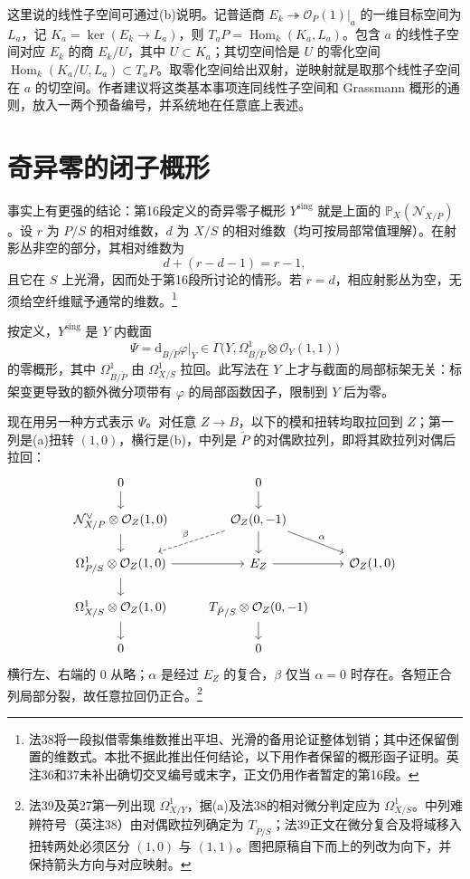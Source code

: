 \documentclass[openany,fontset=fandol]{ctexbook}
\newcommand{\PP}{\mathbb P}
\newcommand{\Ocal}{\mathcal O}
\newcommand{\N}{\mathcal N}
\newcommand{\Pdual}{\check P}
\newcommand{\Ysing}{Y^{\mathrm{sing}}}
\begin{document}
这里说的线性子空间可通过(b)说明。记普适商 $E_k\twoheadrightarrow\Ocal_P(1)|_a$ 的一维目标空间为 $L_a$，记 $K_a=\ker(E_k\to L_a)$，则 $T_aP=\operatorname{Hom}_k(K_a,L_a)$。包含 $a$ 的线性子空间对应 $E_k$ 的商 $E_k/U$，其中 $U\subset K_a$；其切空间恰是 $U$ 的零化空间 $\operatorname{Hom}_k(K_a/U,L_a)\subset T_aP$。取零化空间给出双射，逆映射就是取那个线性子空间在 $a$ 的切空间。作者建议将这类基本事项连同线性子空间和 Grassmann 概形的通则，放入一两个预备编号，并系统地在任意底上表述。

\newpage
\section*{奇异零的闭子概形}
事实上有更强的结论：第16段定义的奇异零子概形 $\Ysing$ 就是上面的 $\PP_X(\N_{X/P})$。设 $r$ 为 $P/S$ 的相对维数，$d$ 为 $X/S$ 的相对维数（均可按局部常值理解）。在射影丛非空的部分，其相对维数为
\[
 d+(r-d-1)=r-1,
\]
且它在 $S$ 上光滑，因而处于第16段所讨论的情形。若 $r=d$，相应射影丛为空，无须给空纤维赋予通常的维数。\footnote{法38将一段拟借零集维数推出平坦、光滑的备用论证整体划销；其中还保留倒置的维数式。本批不据此推出任何结论，以下用作者保留的概形函子证明。英注36和37未补出确切交叉编号或末字，正文仍用作者暂定的第16段。}

按定义，$\Ysing$ 是 $Y$ 内截面
\[
 \Psi=\mathrm d_{B/\Pdual}\varphi\big|_Y
 \in\Gamma\bigl(Y,\Omega^1_{B/\Pdual}\otimes\Ocal_Y(1,1)\bigr)
\]
的零概形，其中 $\Omega^1_{B/\Pdual}$ 由 $\Omega^1_{X/S}$ 拉回。此写法在 $Y$ 上才与截面的局部标架无关：标架变更导致的额外微分项带有 $\varphi$ 的局部函数因子，限制到 $Y$ 后为零。

现在用另一种方式表示 $\Psi$。对任意 $Z\to B$，以下的模和扭转均取拉回到 $Z$；第一列是(a)扭转 $(1,0)$，横行是(b)，中列是 $\Pdual$ 的对偶欧拉列，即将其欧拉列对偶后拉回：
\[
\begin{tikzcd}[row sep=3.3ex,column sep=2.4em]
0\arrow[d] &0\arrow[d] \\
\N^\vee_{X/P}\otimes\Ocal_Z(1,0)\arrow[d] &
 \Ocal_Z(0,-1)\arrow[d]\arrow[dl,dashed,swap,"\beta"]\arrow[dr,"\alpha"] \\
\Omega^1_{P/S}\otimes\Ocal_Z(1,0)\arrow[r]\arrow[d] &
 E_Z\arrow[r] &\Ocal_Z(1,0)\\
\Omega^1_{X/S}\otimes\Ocal_Z(1,0)\arrow[d] &
 T_{\Pdual/S}\otimes\Ocal_Z(0,-1)\arrow[d]\\
0&0
\end{tikzcd}
\]
\noindent 横行左、右端的 $0$ 从略；$\alpha$ 是经过 $E_Z$ 的复合，$\beta$ 仅当 $\alpha=0$ 时存在。各短正合列局部分裂，故任意拉回仍正合。\footnote{法39及英27第一列出现 $\Omega^1_{X/Y}$，据(a)及法38的相对微分判定应为 $\Omega^1_{X/S}$。中列难辨符号（英注38）由对偶欧拉列确定为 $T_{\Pdual/S}$；法39正文在微分复合及将域移入扭转两处必须区分 $(1,0)$ 与 $(1,1)$。图把原稿自下而上的列改为向下，并保持箭头方向与对应映射。}
\end{document}
